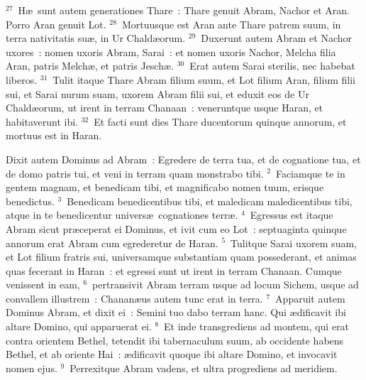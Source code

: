 ${}^{27}$~H\ae\ sunt autem generationes Thare~: Thare genuit Abram, Nachor et Aran. Porro Aran genuit Lot.
${}^{28}$~Mortuusque est Aran ante Thare patrem suum, in terra nativitatis su\ae , in Ur Chald\ae orum.
${}^{29}$~Duxerunt autem Abram et Nachor uxores~: nomen uxoris Abram, Sarai~: et nomen uxoris Nachor, Melcha filia Aran, patris Melch\ae , et patris Jesch\ae .
${}^{30}$~Erat autem Sarai sterilis, nec habebat liberos.
${}^{31}$~Tulit itaque Thare Abram filium suum, et Lot filium Aran, filium filii sui, et Sarai nurum suam, uxorem Abram filii sui, et eduxit eos de Ur Chald\ae orum, ut irent in terram Chanaan~: veneruntque usque Haran, et habitaverunt ibi.
${}^{32}$~Et facti sunt dies Thare ducentorum quinque annorum, et mortuus est in Haran.

\lettrine[lines=3,image=true,loversize=0.05,lraise=-0.03]{D}{}ixit autem Dominus ad Abram~: Egredere de terra tua, et de cognatione tua, et de domo patris tui, et veni in terram quam monstrabo tibi.
${}^{2}$~Faciamque te in gentem magnam, et benedicam tibi, et magnificabo nomen tuum, erisque benedictus.
${}^{3}$~Benedicam benedicentibus tibi, et maledicam maledicentibus tibi, atque in te benedicentur univers\ae\ cognationes terr\ae .
${}^{4}$~Egressus est itaque Abram sicut pr\ae ceperat ei Dominus, et ivit cum eo Lot~: septuaginta quinque annorum erat Abram cum egrederetur de Haran.
${}^{5}$~Tulitque Sarai uxorem suam, et Lot filium fratris sui, universamque substantiam quam possederant, et animas quas fecerant in Haran~: et egressi sunt ut irent in terram Chanaan. Cumque venissent in eam,
${}^{6}$~pertransivit Abram terram usque ad locum Sichem, usque ad convallem illustrem~: Chanan\ae us autem tunc erat in terra.
${}^{7}$~Apparuit autem Dominus Abram, et dixit ei~: Semini tuo dabo terram hanc. Qui \ae dificavit ibi altare Domino, qui apparuerat ei.
${}^{8}$~Et inde transgrediens ad montem, qui erat contra orientem Bethel, tetendit ibi tabernaculum suum, ab occidente habens Bethel, et ab oriente Hai~: \ae dificavit quoque ibi altare Domino, et invocavit nomen ejus.
${}^{9}$~Perrexitque Abram vadens, et ultra progrediens ad meridiem.


